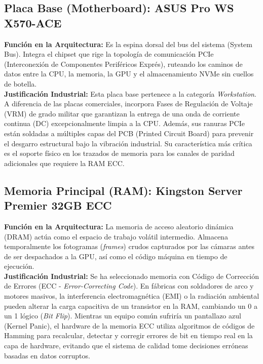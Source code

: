 \documentclass[12pt,letterpaper]{article}
\begin{document}
\subsection{Placa Base (Motherboard): ASUS Pro WS X570-ACE}
\textbf{Función en la Arquitectura:} Es la espina dorsal del bus del sistema (System Bus). Integra el chipset que rige la topología de comunicación PCIe (Interconexión de Componentes Periféricos Exprés), ruteando los caminos de datos entre la CPU, la memoria, la GPU y el almacenamiento NVMe sin cuellos de botella.
\\
\textbf{Justificación Industrial:} Esta placa base pertenece a la categoría \textit{Workstation}. A diferencia de las placas comerciales, incorpora Fases de Regulación de Voltaje (VRM) de grado militar que garantizan la entrega de una onda de corriente continua (DC) excepcionalmente limpia a la CPU. Además, sus ranuras PCIe están soldadas a múltiples capas del PCB (Printed Circuit Board) para prevenir el desgarro estructural bajo la vibración industrial. Su característica más crítica es el soporte físico en los trazados de memoria para los canales de paridad adicionales que requiere la RAM ECC.

\subsection{Memoria Principal (RAM): Kingston Server Premier 32GB ECC}
\textbf{Función en la Arquitectura:} La memoria de acceso aleatorio dinámica (DRAM) actúa como el espacio de trabajo volátil intermedio. Almacena temporalmente los fotogramas (\textit{frames}) crudos capturados por las cámaras antes de ser despachados a la GPU, así como el código máquina en tiempo de ejecución.
\\
\textbf{Justificación Industrial:} Se ha seleccionado memoria con Código de Corrección de Errores (ECC - \textit{Error-Correcting Code}). En fábricas con soldadores de arco y motores masivos, la interferencia electromagnética (EMI) o la radiación ambiental pueden alterar la carga capacitiva de un transistor en la RAM, cambiando un 0 a un 1 lógico (\textit{Bit Flip}). Mientras un equipo común sufriría un pantallazo azul (Kernel Panic), el hardware de la memoria ECC utiliza algoritmos de códigos de Hamming para recalcular, detectar y corregir errores de bit en tiempo real en la capa de hardware, evitando que el sistema de calidad tome decisiones erróneas basadas en datos corruptos.
\end{document}
